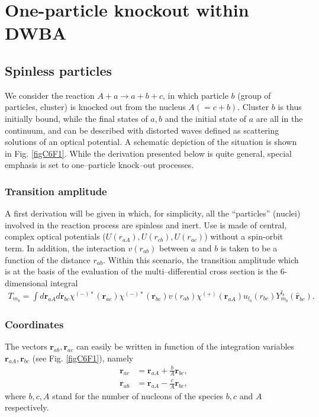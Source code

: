 \section{One-particle knockout within DWBA}\label{C6AppF}
\subsection{Spinless particles}
We  consider the reaction $A+a \rightarrow a+b+c$, in which particle $b$ (group of particles, cluster) is knocked out from the nucleus $A(=c+b)$. Cluster $b$ is thus initially bound, while the final states of $a,b$ and the initial state of $a$ are all in the continuum, and can be described with distorted waves defined as scattering solutions of an optical potential. A schematic depiction of the situation is shown in Fig. \ref{figC6F1}. While the derivation presented below is quite general, special emphasis is set to one--particle knock--out processes. 
\subsubsection{Transition amplitude}
A first derivation will be given in which, for simplicity, all the ``particles'' (nuclei) involved in the reaction process are spinless and inert. Use is made of central, complex optical potentials ($U(r_{aA}),U(r_{cb}),U(r_{ac})$)  without a spin-orbit term. In addition, the interaction $v(r_{ab})$ between $a$ and $b$ is taken to be a function of the distance $r_{ab}$. Within this scenario, the transition amplitude which is at the basis of the evaluation of the multi--differential cross section is the 6-dimensional integral
\begin{equation}\label{eqC6AppF1}
\begin{split}
T_{m_b}=\int d\mathbf{r}_{aA}d \mathbf{r}_{bc}\chi^{(-)*}(\mathbf{r}_{ac})\chi^{(-)*}(\mathbf{r}_{bc})v(r_{ab})\chi^{(+)}(\mathbf{r}_{aA})u_{l_b}(r_{bc})Y^{l_b}_{m_b}(\hat{\mathbf{r}}_{bc}).
\end{split}
\end{equation}
\subsubsection{Coordinates}
The vectors $\mathbf{r}_{ab},\mathbf{r}_{ac}$ can easily be written in function of the integration variables $\mathbf{r}_{aA},\mathbf{r}_{bc}$ (see Fig. \ref{figC6F1}), namely
\begin{equation}\label{eq6G2}
\begin{split}
\mathbf{r}_{ac}&=\mathbf{r}_{aA}+\frac{b}{A}\mathbf{r}_{bc},\\
\mathbf{r}_{ab}&=\mathbf{r}_{aA}-\frac{c}{A}\mathbf{r}_{bc},
\end{split}
\end{equation}
where $b,c,A$ stand for the number of nucleons of the species $b,c$ and $A$ respectively.
